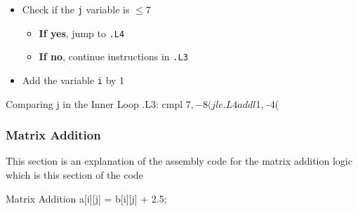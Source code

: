 \documentclass[12pt, a4paper]{article}
\begin{document}
                \begin{itemize}
                    \item Check if the \texttt{j} variable is $\leq 7$
                    \begin{itemize}
                        \item \textbf{If yes}, jump to \texttt{.L4}
                        \item \textbf{If no}, continue instructions in \texttt{.L3}
                    \end{itemize}
                    \item Add the variable \texttt{i} by 1
                \end{itemize}
                \begin{codeblock}[minted language=asm]{Comparing j in the Inner Loop}
                    .L3:
                        cmpl    $7, -8(%
                        jle .L4
                        addl    $1, -4(%
                \end{codeblock}

    \pagebreak

            \subsubsection{Matrix Addition}
                This section is an explanation of the assembly code for the matrix addition logic which is this section of the code
                \begin{codeblock}[minted language=c]{Matrix Addition}
                    a[i][j] = b[i][j] + 2.5;
                \end{codeblock}
\end{document}
